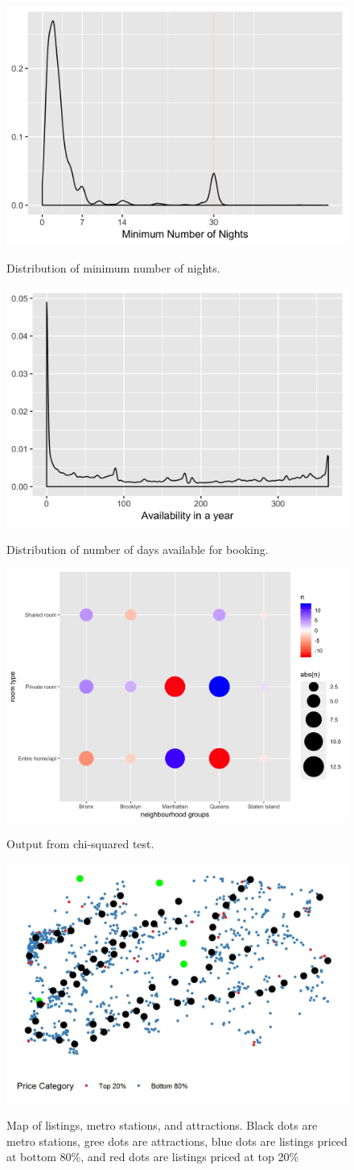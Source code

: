 \documentclass[10pt]{jmlr}%
\begin{document}
\begin{figure}[htbp]
	\centering
	\caption{Distribution of minimum number of nights.}
	\includegraphics[width=0.5\linewidth]{length_stay_density.jpeg}
	\label{fig:length_stay_density}
\end{figure}

\begin{figure}[htbp]
	\centering
	\caption{Distribution of number of days available for booking.}
	\includegraphics[width=0.5\linewidth]{availability_density.jpeg}
	\label{fig:availability_density}
\end{figure}

\begin{figure}[htbp]
	\centering
	\caption{Output from chi-squared test.}
	\includegraphics[width=0.5\linewidth]{room_type.jpeg}
	\label{fig:room_type}
\end{figure}

\begin{figure}[htbp]
	\centering
	\caption{Map of listings, metro stations, and attractions. Black dots are metro stations, gree dots are attractions, blue dots are listings priced at bottom 80\%, and red dots are listings priced at top 20\%}
	\includegraphics[width=0.5\linewidth]{map_eda.jpeg}
	\label{fig:map_eda}
\end{figure}
\end{document}

